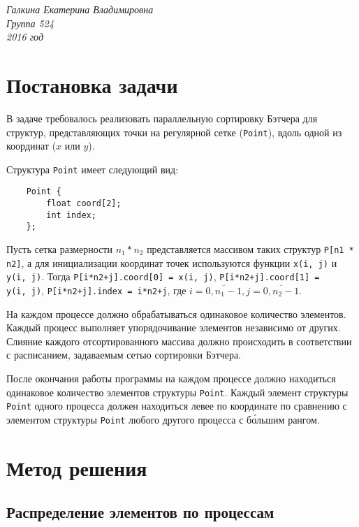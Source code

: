 \documentclass[oneside,final,14pt]{extreport}
\begin{document}
\vspace{0.4cm}
\begin{large}
\noindent
\textit{Галкина Екатерина Владимировна\\
Группа 524\\
2016 год}
\end{large}

\vspace{0.4cm}

{\let\clearpage\relax \chapter*{Постановка задачи}}

В задаче требовалось реализовать параллельную сортировку Бэтчера для структур,
представляющих точки на регулярной сетке (\texttt{Point}), вдоль одной из
координат ($x$ или $y$).

Структура \texttt{Point} имеет следующий вид:
\begin{verbatim}
    Point {
        float coord[2];
        int index;
    };
\end{verbatim}

Пусть сетка размерности $n_1 * n_2$ представляется массивом таких структур
\texttt{P[n1 * n2]}, а для инициализации координат точек используются функции
\texttt{x(i,~j)} и \texttt{y(i,~j)}.
Тогда \texttt{P[i*n2+j].coord[0] = x(i,~j)},
\texttt{P[i*n2+j].coord[1] = y(i,~j)}, \texttt{P[i*n2+j].index = i*n2+j}, где $i = \overline{0, n_1-1},
j = \overline{0,n_2-1}$.

На каждом процессе должно обрабатываться одинаковое количество элементов.
Каждый процесс выполняет упорядочивание элементов независимо от других.
Слияние каждого отсортированного массива должно происходить в соответствии с
расписанием, задаваемым сетью сортировки Бэтчера.

После окончания работы программы на каждом процессе должно находиться одинаковое
количество элементов структуры \texttt{Point}. Каждый элемент структуры
\texttt{Point} одного процесса должен находиться левее по координате
по сравнению с элементом структуры \texttt{Point} любого другого процесса с
б\'{о}льшим рангом.

\chapter*{Метод решения}

\section*{Распределение элементов по процессам}
\end{document}
